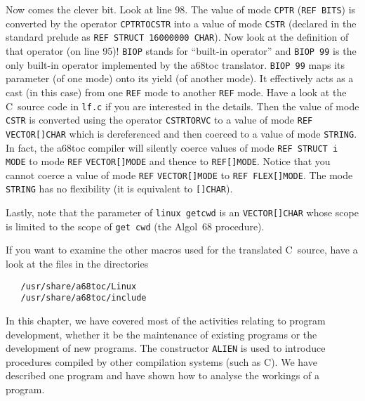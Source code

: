 Now comes the clever bit. Look at line 98. The value of mode
\verb|CPTR| (\verb|REF BITS|) is converted by the operator
\verb|CPTRTOCSTR| into a value of mode \verb|CSTR| (declared in the
standard prelude as \verb|REF STRUCT 16000000 CHAR|). Now look at the
definition of that operator (on line 95)! \verb|BIOP| stands for
``built-in operator'' and \verb|BIOP 99| is the only built-in
operator implemented by the a68toc translator. \verb|BIOP 99| maps
its parameter (of one mode) onto its yield (of another mode). It
effectively acts as a cast (in this case) from one \verb|REF| mode to
another \verb|REF| mode. Have a look at the C~source code in
\verb|lf.c| if you are interested in the details. Then the value of
mode \verb|CSTR| is converted using the operator \verb|CSTRTORVC| to
a value of mode \verb|REF VECTOR[]CHAR| which is dereferenced and
then coerced to a value of mode \verb|STRING|. In fact, the a68toc
compiler will silently coerce values of mode \verb|REF STRUCT i MODE|
to mode \verb|REF| \verb|VECTOR[]MODE| and thence to
\verb|REF[]MODE|.  Notice that you cannot coerce a value of mode
\verb|REF| \verb|VECTOR[]MODE| to \verb|REF FLEX[]MODE|. The mode
\verb|STRING| has no flexibility (it is equivalent to \verb|[]CHAR|).

Lastly, note that the parameter of \verb|linux getcwd| is an
 \verb|VECTOR[]CHAR| whose scope
is limited to the scope of \verb|get cwd| (the Algol~68 procedure).

If you want to examine the other macros used for the translated
C~source, have a look at the files in the directories
\begin{verbatim}
   /usr/share/a68toc/Linux
   /usr/share/a68toc/include
\end{verbatim}

In this chapter, we have covered most of the activities relating to
program development, whether it be the maintenance of existing
programs or the development of new programs. The constructor
\verb|ALIEN| is used to introduce procedures compiled by other
compilation systems (such as C). We have described one program
and have shown how to analyse the workings of a program.
